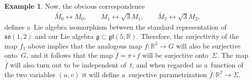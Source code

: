 \documentclass[10pt,a4paper]{amsart}
\numberwithin{equation}{section}
\theoremstyle{definition}
\newtheorem{exmpl}[teo]{Example}
\begin{document}
\begin{exmpl}
Now, the obvious correspondence
\begin{gather*}
\bar{M}_0 \leftrightarrow M_0,
\qquad
\bar{M}_1 \leftrightarrow \sqrt{3} M_1,
\qquad
\bar{M}_2 \leftrightarrow \sqrt{3} M_2,
\end{gather*}
def\/ines a~Lie algebra isomorphism between the standard representation of $\mathfrak{so}(1,2)$ and our Lie algebra
$\mathfrak{g} \subset \mathfrak{gl}(5,\mathbb{R})$.
Therefore, the surjectivity of the map $f_1$ above implies that the analogous map $f:\mathbb{R}^3 \to G$ will also be
surjective onto~$G$, and it follows that the map $\bar{f} = \pi \circ f$ will be surjective onto~$\Sigma$.
The map $\bar{f}$ will also turn out to be independent of~$t$, and when regarded as a~function of the two variables
$(u,v)$ it will def\/ine a~surjective parametrization $\bar{f}:\mathbb{R}^2 \to \Sigma$.


\end{exmpl}
\end{document}
